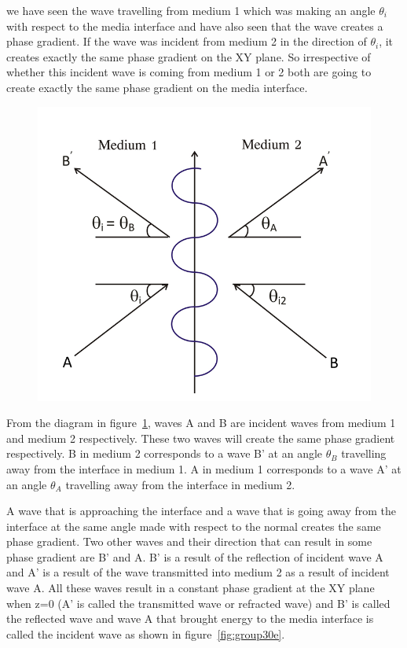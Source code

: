 we have seen the wave travelling from medium 1  which was making an angle $\theta_i$ with respect to the media interface and have also seen that the wave creates a phase gradient. If the wave was incident from medium 2 in the direction of $\theta_i$, it creates exactly the same phase gradient on the XY plane. So irrespective of whether this incident wave is coming from medium 1 or 2 both are going to create exactly the same phase gradient on the media interface.
\begin{figure}[h]
\centering
\includegraphics[width=.7\linewidth]{./graphics/incident_and_reflected_waves}
\caption{}
\label{fig:group30d---copy}
\end{figure}

From the diagram in figure~\ref{fig:group30d---copy}, waves A and B are incident waves from medium 1 and medium 2 respectively. These two waves will create the same phase gradient respectively. B in medium 2 corresponds to a wave B'  at an angle $\theta_B$ travelling away from the interface in medium 1. A in medium 1 corresponds to a wave A' at an angle $\theta_A$ travelling away from the interface in medium 2.

A wave that is approaching the interface and a wave that is going away from the interface at the same angle made with respect to the normal creates the same phase gradient. Two other waves and their direction that can result in some phase gradient are B'
and A. B' is a result of the reflection of incident wave A and A' is a result of the wave transmitted into medium 2 as a result of incident wave A. All these waves result in a constant phase gradient at the XY plane when z=0 (A' is called the transmitted wave or refracted wave) and B' is called the reflected wave and wave A that brought energy to the media interface is called the incident wave as shown in figure~\ref{fig:group30e}.

